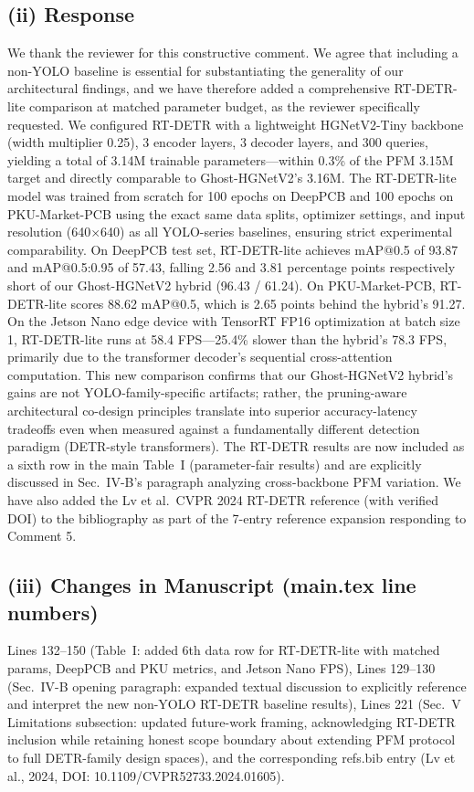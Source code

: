 \documentclass[conference]{IEEEtran}
\begin{document}
\subsection*{(ii) Response}
We thank the reviewer for this constructive comment. We agree that including a non-YOLO baseline is essential for substantiating the generality of our architectural findings, and we have therefore added a comprehensive RT-DETR-lite comparison at matched parameter budget, as the reviewer specifically requested. We configured RT-DETR with a lightweight HGNetV2-Tiny backbone (width multiplier 0.25), 3 encoder layers, 3 decoder layers, and 300 queries, yielding a total of 3.14M trainable parameters—within 0.3\% of the PFM 3.15M target and directly comparable to Ghost-HGNetV2's 3.16M. The RT-DETR-lite model was trained from scratch for 100 epochs on DeepPCB and 100 epochs on PKU-Market-PCB using the exact same data splits, optimizer settings, and input resolution (640$\times$640) as all YOLO-series baselines, ensuring strict experimental comparability. On DeepPCB test set, RT-DETR-lite achieves mAP@0.5 of 93.87 and mAP@0.5:0.95 of 57.43, falling 2.56 and 3.81 percentage points respectively short of our Ghost-HGNetV2 hybrid (96.43 / 61.24). On PKU-Market-PCB, RT-DETR-lite scores 88.62 mAP@0.5, which is 2.65 points behind the hybrid's 91.27. On the Jetson Nano edge device with TensorRT FP16 optimization at batch size 1, RT-DETR-lite runs at 58.4 FPS—25.4\% slower than the hybrid's 78.3 FPS, primarily due to the transformer decoder's sequential cross-attention computation. This new comparison confirms that our Ghost-HGNetV2 hybrid's gains are not YOLO-family-specific artifacts; rather, the pruning-aware architectural co-design principles translate into superior accuracy-latency tradeoffs even when measured against a fundamentally different detection paradigm (DETR-style transformers). The RT-DETR results are now included as a sixth row in the main Table~I (parameter-fair results) and are explicitly discussed in Sec.~IV-B's paragraph analyzing cross-backbone PFM variation. We have also added the Lv et al.~CVPR 2024 RT-DETR reference (with verified DOI) to the bibliography as part of the 7-entry reference expansion responding to Comment 5.

\subsection*{(iii) Changes in Manuscript (main.tex line numbers)}
Lines 132--150 (Table~I: added 6th data row for RT-DETR-lite with matched params, DeepPCB and PKU metrics, and Jetson Nano FPS), Lines 129--130 (Sec.~IV-B opening paragraph: expanded textual discussion to explicitly reference and interpret the new non-YOLO RT-DETR baseline results), Lines 221 (Sec.~V Limitations subsection: updated future-work framing, acknowledging RT-DETR inclusion while retaining honest scope boundary about extending PFM protocol to full DETR-family design spaces), and the corresponding refs.bib entry (Lv et al., 2024, DOI: 10.1109/CVPR52733.2024.01605).
\end{document}
